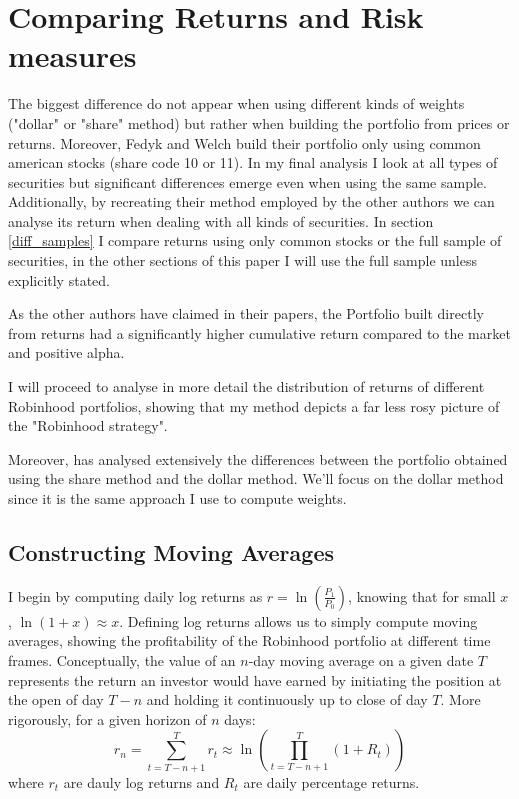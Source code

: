 
\section{Comparing Returns and Risk measures}
The biggest difference do not appear when using different kinds of weights ("dollar" or "share" method) but rather when building the portfolio from prices or returns. 
Moreover, Fedyk and Welch build their portfolio only using common american stocks (share code 10 or 11). 
In my final analysis I look at all types of securities but significant differences emerge even when using the same sample. 
Additionally, by recreating their method employed by the other authors we can analyse its return when dealing with all kinds of securities. 
In section \ref{diff_samples} I compare returns using only common stocks or the full sample of securities, in the other sections of this paper I will use the full sample unless explicitly stated.

As the other authors have claimed in their papers, the Portfolio built directly from returns had a significantly higher cumulative return compared to the market and positive alpha.

I will proceed to analyse in more detail the distribution of returns of different Robinhood portfolios, showing that my method depicts a far less rosy picture of the "Robinhood strategy".

Moreover, \cite{Fedyk2024} has analysed extensively the differences between the portfolio obtained using the share method and the dollar method. 
We'll focus on the dollar method since it is the same approach I use to compute weights.

\subsection{Constructing Moving Averages}
I begin by computing daily log returns as $r = \ln\left(\frac{P_1}{P_0}\right)$, knowing that for small $x$, $\ln(1+x)\approx x$. 
Defining log returns allows us to simply compute moving averages, showing the profitability of the Robinhood portfolio at different time frames.
Conceptually, the value of an $n$-day moving average on a given date $T$ represents the return an investor would have earned by initiating the position at the open of day $T-n$ and holding it continuously up to close of day $T$.
More rigorously, for a given horizon of $n$ days:
\begin{equation}
    r_n = \sum_{t=T-n+1}^{T} r_t \approx \ln \left( \prod_{t=T-n+1}^{T} (1+R_t) \right)
\end{equation}
where $r_t$ are dauly log returns and $R_t$ are daily percentage returns.


